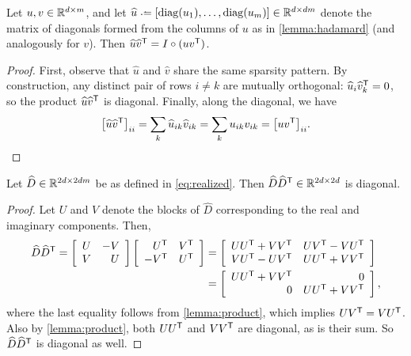 \documentclass{article} %
\begin{document}
\begin{lemma}
Let ${u, v \in \mathbb{R}^{d\times m}}$, and let ${\widehat{u} \defeq
[\diag(u_1),\dots,\diag(u_m)] \in \R^{d\times dm}}$ denote the 
matrix of diagonals formed from the columns of $u$ as in \cref{lemma:hadamard} 
(and analogously for $v$).  Then ${\widehat{u}\widehat{v}^\mathsf{T} = I \circ (uv^\mathsf{T})}$.
\label{lemma:product}
\end{lemma}
\begin{proof}
First, observe that $\widehat{u}$ and $\widehat{v}$ share the same sparsity pattern.  
By construction, any distinct pair of rows $i \neq k$ are mutually orthogonal:
$\widehat{u}_i \widehat{v}_k^\mathsf{T} = 0$, so the product $\widehat{u}\widehat{v}^\mathsf{T}$ 
is diagonal.  Finally, along the diagonal, we have
\[
{\left[\widehat{u}\widehat{v}^\mathsf{T}\right]}_{ii} = \sum_k \widehat{u}_{ik}
\widehat{v}_{ik} = \sum_{k} u_{ik} v_{ik} = {\left[uv^\mathsf{T}\right]}_{ii}.
\]
\end{proof}

\begin{theorem}
Let $\widehat{D} \in \mathbb{R}^{2d\times 2dm}$ be as defined in \eqref{eq:realized}.  Then
$\widehat{D}\widehat{D}^\mathsf{T} \in \mathbb{R}^{2d\times 2d}$ is diagonal.\label{thm:diagonal}
\end{theorem}
\begin{proof}
Let $U$ and $V$ denote the blocks of $\widehat{D}$ corresponding to the
real and imaginary components.  Then,
\begin{align}
\widehat{D}\widehat{D}^\mathsf{T} = \left[\begin{array}{rr}U & -V\\ V & U\end{array}\right]
\left[\begin{array}{rr} U^\mathsf{T} & V^\mathsf{T}\\ -V^\mathsf{T} & U^\mathsf{T}\end{array}\right]
&= \left[\begin{array}{rr} UU^\mathsf{T} + VV^\mathsf{T} & UV^\mathsf{T} - VU^\mathsf{T} \\ VU^\mathsf{T} -
UV^\mathsf{T} & UU^\mathsf{T} + VV^\mathsf{T}\end{array} \right]\notag\\
&= \left[\begin{array}{rr}UU^\mathsf{T} + VV^\mathsf{T} & 0 \\ 0 & UU^\mathsf{T} + VV^\mathsf{T}\end{array}
\right],\label{eq:dictpower}
\end{align}
where the last equality follows from \cref{lemma:product}, which implies 
$UV^\mathsf{T} = VU^\mathsf{T}$.  Also by \cref{lemma:product}, both $UU^\mathsf{T}$ and $VV^\mathsf{T}$ are 
diagonal, as is their sum.  So $\widehat{D}\widehat{D}^\mathsf{T}$ is diagonal as well.
\end{proof}
\end{document}
